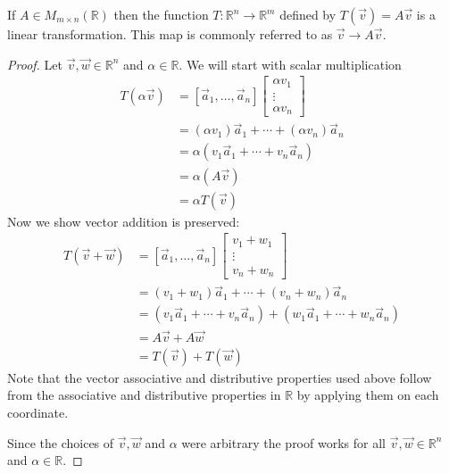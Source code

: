 \begin{proposition} If $A \in M_{m \times n}(\mathbb{R})$ then the function 
$T:\mathbb{R}^n \to \mathbb{R}^m$ defined by $T(\vec{v})=A\vec{v}$ is a linear 
transformation. This map is commonly referred to as $\vec{v} \to A\vec{v}$.
\end{proposition}
\begin{proof}
Let $\vec{v},\vec{w} \in \mathbb{R}^n$ and $\alpha \in \mathbb{R}$. 
We will start with scalar multiplication 
\begin{align*}
T(\alpha\vec{v})
&=[\vec{a}_1, \ldots, \vec{a}_n]
\begin{bmatrix}\alpha v_1\\ \vdots \\ \alpha v_n\end{bmatrix}\\
&=(\alpha v_1)\vec{a}_1+\cdots+(\alpha v_n)\vec{a}_n\\
&=\alpha (v_1\vec{a}_1+\cdots+v_n\vec{a}_n)\\
&=\alpha (A\vec{v})\\
&=\alpha T(\vec{v})
\end{align*}
Now we show vector addition is preserved:
\begin{align*}
T(\vec{v}+\vec{w})
&=[\vec{a}_1, \ldots, \vec{a}_n]\begin{bmatrix}v_1+w_1\\ \vdots \\ v_n+w_n\end{bmatrix}\\
&=(v_1+w_1)\vec{a}_1+\cdots+(v_n+w_n)\vec{a}_n\\
&=(v_1\vec{a}_1+\cdots+v_n\vec{a}_n)+(w_1\vec{a}_1+\cdots+w_n\vec{a}_n)\\
&=A\vec{v}+A\vec{w}\\
&=T(\vec{v})+T(\vec{w})
\end{align*}
Note that the vector associative and distributive properties used above 
follow from the associative and distributive properties in $\mathbb{R}$ 
by applying them on each coordinate.

Since the choices of $\vec{v},\vec{w}$ and $\alpha$ were arbitrary the proof 
works for all $\vec{v},\vec{w} \in \mathbb{R}^n$ and $\alpha \in \mathbb{R}$.
\end{proof}


